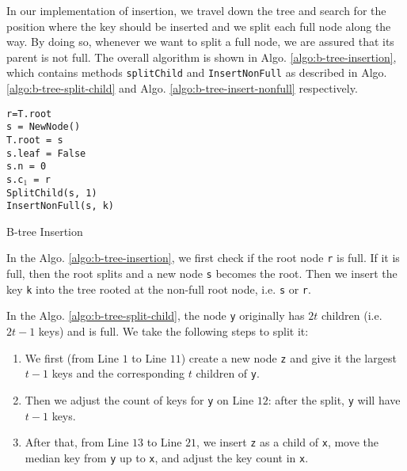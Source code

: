 In our implementation of insertion, we travel down the tree and search for the position where the key should be inserted and we split each full node along the way. By doing so, whenever we want to split a full node, we are assured that its parent is not full. The overall algorithm is shown in Algo. \ref{algo:b-tree-insertion}, which contains methods \texttt{splitChild} and \texttt{InsertNonFull} as described in Algo. \ref{algo:b-tree-split-child} and Algo. \ref{algo:b-tree-insert-nonfull} respectively.

\begin{algorithm}[H]
\SetAlgoLined
{}
	\texttt{r=T.root} \\
  {
  \texttt{s = NewNode()} \\
  \texttt{T.root = s} \\
  \texttt{s.leaf = False} \\
  \texttt{s.n = 0} \\
  \texttt{s.c$_1$ = r} \\
  \texttt{SplitChild(s, 1)} \\
  \texttt{InsertNonFull(s, k)} \\
 }
 \caption{B-tree Insertion}
 \label{algo:b-tree-insertion}
\end{algorithm}

In the Algo. \ref{algo:b-tree-insertion}, we first check if the root node \texttt{r} is full. If it is full, then the root splits and a new node \texttt{s} becomes the root. Then we insert the key \texttt{k} into the tree rooted at the non-full root node, i.e. \texttt{s} or \texttt{r}.

In the Algo. \ref{algo:b-tree-split-child}, the node \texttt{y} originally has $2t$ children (i.e. $2t-1$ keys) and is full. We take the following steps to split it:

\begin{enumerate}
	\item We first (from Line $1$ to Line $11$) create a new node \texttt{z} and give it the largest $t-1$ keys and the corresponding $t$ children of \texttt{y}.
	\item Then we adjust the count of keys for \texttt{y} on Line $12$: after the split, \texttt{y} will have $t-1$ keys.
	\item After that, from Line $13$ to Line $21$, we insert \texttt{z} as a child of \texttt{x}, move the median key from \texttt{y} up to \texttt{x}, and adjust the key count in \texttt{x}.
\end{enumerate}

